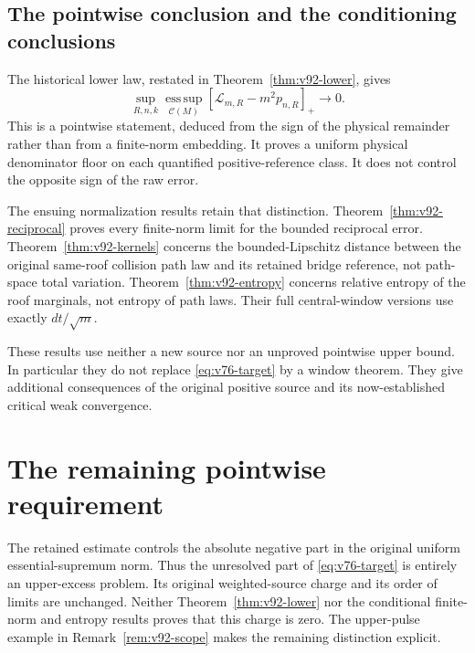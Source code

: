 \documentclass[11pt,reqno]{amsart}
\numberwithin{equation}{section}
\theoremstyle{definition}\newtheorem{definition}[theorem]{Definition}
\theoremstyle{remark}\newtheorem{remark}[theorem]{Remark}
\theoremstyle{definition}\newtheorem{inputstatement}[theorem]{Input statement}
\newcommand{\esssup}{\operatorname*{ess\,sup}}
\begin{document}


\subsection{The pointwise conclusion and the conditioning conclusions}
The historical lower law, restated in Theorem~\ref{thm:v92-lower}, gives
\[
 \sup_{R,n,k}\esssup_{\mathcal C(M)}[\mathcal L_{m,R}-m^2p_{n,R}]_+
                                                     \longrightarrow0.
\]
This is a pointwise statement, deduced from the sign of the physical
remainder rather than from a finite-norm embedding. It proves a uniform
physical denominator floor on each quantified positive-reference class.
It does not control the opposite sign of the raw error.

The ensuing normalization results retain that distinction.
Theorem~\ref{thm:v92-reciprocal} proves every finite-norm limit for the
bounded reciprocal error. Theorem~\ref{thm:v92-kernels} concerns the
bounded-Lipschitz distance between the original same-roof collision path
law and its retained bridge reference, not path-space total variation.
Theorem~\ref{thm:v92-entropy} concerns relative entropy of the roof
marginals, not entropy of path laws. Their full central-window versions
use exactly $dt/\sqrt m$.

These results use neither a new source nor an unproved pointwise upper
bound. In particular they do not replace \eqref{eq:v76-target} by a
window theorem. They give additional consequences of the original
positive source and its now-established critical weak convergence.






\section{The remaining pointwise requirement}
The retained estimate controls the absolute negative part in the
original uniform essential-supremum norm. Thus the unresolved part of
\eqref{eq:v76-target} is entirely an upper-excess problem. Its original
weighted-source charge and its order of limits are unchanged. Neither
Theorem~\ref{thm:v92-lower} nor the conditional finite-norm and entropy
results proves that this charge is zero. The upper-pulse example in
Remark~\ref{rem:v92-scope} makes the remaining distinction explicit.
\end{document}

